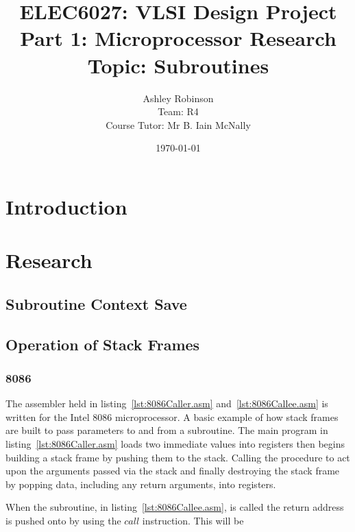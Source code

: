 \documentclass[12pt,a4paper]{article}
\title{ELEC6027: VLSI Design Project \\Part 1: Microprocessor Research\\Topic: Subroutines}
\author{Ashley Robinson\\ Team: R4\\Course Tutor: Mr B. Iain McNally}
\date{\today}
\begin{document}
\begin{titlepage}
\maketitle
\end{titlepage}

\tableofcontents
\clearpage

\lstset{
    basicstyle=\footnotesize        %
}


\section{Introduction}


\section{Research}

\subsection{Subroutine Context Save }

\subsection{Operation of Stack Frames}



\subsubsection{8086}
The assembler held in listing~\ref{lst:8086Caller.asm} and~\ref{lst:8086Callee.asm} is written for the Intel 8086 microprocessor.
A basic example of how stack frames are built to pass parameters to and from a subroutine.
The main program in listing~\ref{lst:8086Caller.asm} loads two immediate values into registers then begins building a stack frame by pushing them to the stack.  
Calling the procedure to act upon the arguments passed via the stack and finally destroying the stack frame by popping data, including any return arguments, into registers.



When the subroutine, in listing~\ref{lst:8086Callee.asm}, is called the return address is pushed onto by using the $call$ instruction.
This will be 

\end{document}
